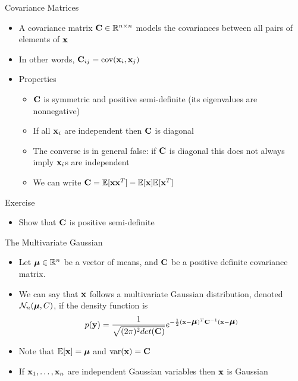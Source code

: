\documentclass{beamer}
\begin{document}
\begin{frame}{Covariance Matrices} 
\begin{itemize} 
 \item A covariance matrix $\textbf{C} \in \mathbb{R}^{n \times n}$ models the covariances between all pairs of elements of $\textbf{x}$
 \item In other words, $\textbf{C}_{ij} = \mbox{cov}(\textbf{x}_i, \textbf{x}_j)$
 \item Properties 
 \begin{itemize}
 \item $\textbf{C}$ is symmetric and positive semi-definite (its eigenvalues are nonnegative) 
 \item If all $\textbf{x}_i$ are independent then $\textbf{C}$ is diagonal 
 \item The converse is in general false: if $\textbf{C}$ is diagonal this does not always imply $\textbf{x}_i$s are independent 
 \item We can write $\textbf{C} = \mathbb{E}[\textbf{x}\textbf{x}^T] - \mathbb{E}[\textbf{x}]\mathbb{E}[\textbf{x}^T]$
 \end{itemize} 
\end{itemize}
\end{frame}

\begin{frame}{Exercise}  
\begin{itemize} 
 \item Show that $\textbf{C}$ is positive semi-definite 
\end{itemize} 
\end{frame}

\begin{frame}{The Multivariate Gaussian}  
\begin{itemize} 
 \item Let $\mbox{\boldmath$\mu$} \in \mathbb{R}^n$ be a vector of means, and $\textbf{C}$ be a positive definite covariance matrix. 
 \item We can say that $\textbf{x}$ follows a multivariate Gaussian distribution, denoted $\mathcal{N}_n(\mbox{\boldmath$\mu$}, C)$, if the density function is 
 \begin{displaymath} 
  p(\textbf{y}) = \frac{1}{\sqrt{(2\pi)^2 det(\textbf{C})}} e^{-\frac{1}{2}(\textbf{x} - \mbox{\boldmath$\mu$})^T\textbf{C}^{-1}(\textbf{x} - \mbox{\boldmath$\mu$})}  
 \end{displaymath}
 \item Note that $\mathbb{E}[\textbf{x}] = \mbox{\boldmath$\mu$}$ and $\mbox{var}(\textbf{x}) = \textbf{C}$  
 \item If $\textbf{x}_1, \ldots, \textbf{x}_n$ are independent Gaussian variables then $\textbf{x}$ is Gaussian 
\end{itemize}
\end{frame}
\end{document}
